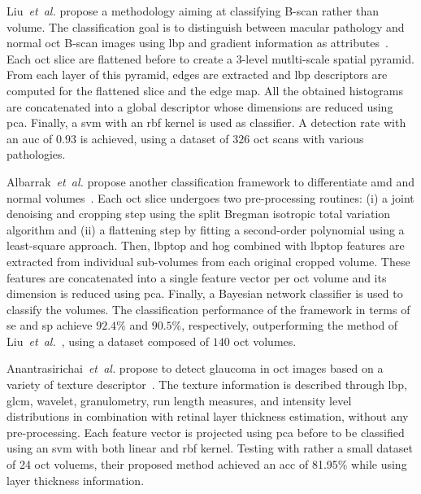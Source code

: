 %
Liu~\textit{et~al.} propose a methodology aiming at classifying B-scan rather than volume.
The classification goal is to distinguish between macular pathology and normal \gls{oct} B-scan images using \gls{lbp} and gradient information as attributes~\cite{Liu2011}.
%
Each \gls{oct} slice are flattened before to create a $3$-level mutlti-scale spatial pyramid.
From each layer of this pyramid, edges are extracted and \gls{lbp} descriptors are computed for the flattened slice and the edge map.
All the obtained histograms are concatenated into a global descriptor whose dimensions are reduced using \gls{pca}.
Finally, a \gls{svm} with an \gls{rbf} kernel is used as classifier.
%
A detection rate with an \gls{auc} of $0.93$ is achieved, using a dataset of $326$ \gls{oct} scans with various pathologies.

Albarrak~\textit{et~al.} propose another classification framework to differentiate \gls{amd} and normal volumes~\cite{albarrak2013age}.
%
Each \gls{oct} slice undergoes two pre-processing routines: (i) a joint denoising and cropping step using the split Bregman isotropic total variation algorithm and (ii) a flattening step by fitting a second-order polynomial using a least-square approach.
Then, \gls{lbptop} and \gls{hog} combined with \gls{lbptop} features are extracted from individual sub-volumes from each original cropped volume.
These features are concatenated into a single feature vector per \gls{oct} volume and its dimension is reduced using \gls{pca}.
Finally, a Bayesian network classifier is used to classify the volumes.
%
The classification performance of the framework in terms of \gls{se} and \gls{sp} achieve $92.4 \%$ and $90.5 \%$, respectively, outperforming the method of Liu~\emph{et~al.}~\cite{Liu2011}, using a dataset composed of $140$ \gls{oct} volumes.

Anantrasirichai~\textit{et~al.} propose to detect glaucoma in \gls{oct} images based on a variety of texture descriptor~\cite{anantrasirichai2013svm}.
%
The texture information is described through \gls{lbp}, \gls{glcm}, wavelet, granulometry, run length measures, and intensity level distributions in combination with retinal layer thickness estimation, without any pre-processing.
Each feature vector is projected using \gls{pca} before to be classified using an \gls{svm} with both linear and \gls{rbf} kernel.
%
Testing with rather a small dataset of 24 \gls{oct} voluems, their proposed method achieved an \gls{acc} of 81.95\% while using layer thickness information.


